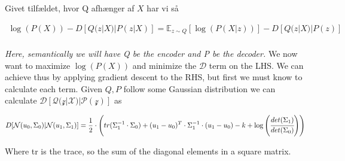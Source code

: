 \documentclass[12pt,a4paper]{report}
\begin{document}
Givet tilfældet, hvor Q afhænger af \(X\) har vi så

\setcounter{equation}{0}
\begin{align*}
\log(P(X))- D[Q(z|X)| P(z|X)] = \mathbb{E}_{z \sim Q} [\log(P(X|z))] - D[Q(z|X)|P(z)]\\
\end{align*}

\emph{Here, semantically we will have Q be the encoder and P be the decoder.}
We now want to maximize \(\log(P(X))\) and minimize the \(\mathcal{D}\) term on the LHS.
We can achieve thus by applying gradient descent to the RHS, but first we must know to calculate each term. 
Given \(Q,P\) follow some Gaussian distribution we can calculate \(\mathcal{D[Q(z|X)|P(z)]}\) as

\setcounter{equation}{0}
\begin{align*}
D[\mathcal{N}(u_{0},\Sigma_{0})|\mathcal{N}(u_{1},\Sigma_{1})] = 
\frac{1}{2} \cdot \left(tr(\Sigma_{1}^{-1} \cdot \Sigma_{0}) + (u_{1}-u_{0})^{T} \cdot \Sigma_{1}^{-1} \cdot (u_{1}- u_{0}) - k + \log\left(\cfrac{det (\Sigma_{1})}{det(\Sigma_{0})}\right)\right)
\end{align*}

Where tr is the trace, so the sum of the diagonal elements in a square matrix.
\end{document}
